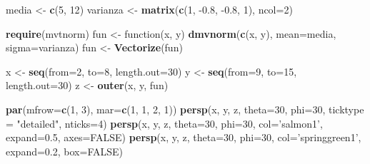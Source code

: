 \documentclass[10pt,]{krantz}
\makeatletter
\newenvironment{Shaded}{\begin{snugshade}}{\end{snugshade}}
\newcommand{\KeywordTok}[1]{\textcolor[rgb]{0.13,0.29,0.53}{\textbf{{#1}}}}
\newcommand{\DataTypeTok}[1]{\textcolor[rgb]{0.13,0.29,0.53}{{#1}}}
\newcommand{\DecValTok}[1]{\textcolor[rgb]{0.00,0.00,0.81}{{#1}}}
\newcommand{\FloatTok}[1]{\textcolor[rgb]{0.00,0.00,0.81}{{#1}}}
\newcommand{\StringTok}[1]{\textcolor[rgb]{0.31,0.60,0.02}{{#1}}}
\newcommand{\OtherTok}[1]{\textcolor[rgb]{0.56,0.35,0.01}{{#1}}}
\newcommand{\NormalTok}[1]{{#1}}
\newenvironment{kframe}{%
\medskip{}
\setlength{\fboxsep}{.8em}
 \def\at@end@of@kframe{}%
 \ifinner\ifhmode%
  \def\at@end@of@kframe{\end{minipage}}%
  \begin{minipage}{\columnwidth}%
 \fi\fi%
 \def\FrameCommand##1{\hskip\@totalleftmargin \hskip-\fboxsep
 \colorbox{shadecolor}{##1}\hskip-\fboxsep
     \hskip-\linewidth \hskip-\@totalleftmargin \hskip\columnwidth}%
 \MakeFramed {\advance\hsize-\width
   \@totalleftmargin\z@ \linewidth\hsize
   \@setminipage}}%
 {\par\unskip\endMakeFramed%
 \at@end@of@kframe}
\renewenvironment{Shaded}{\begin{kframe}}{\end{kframe}}
\makeatother
\begin{document}
\begin{Shaded}
\begin{Highlighting}[]
\NormalTok{media <-}\StringTok{ }\KeywordTok{c}\NormalTok{(}\DecValTok{5}\NormalTok{, }\DecValTok{12}\NormalTok{)}
\NormalTok{varianza <-}\StringTok{ }\KeywordTok{matrix}\NormalTok{(}\KeywordTok{c}\NormalTok{(}\DecValTok{1}\NormalTok{, -}\FloatTok{0.8}\NormalTok{, -}\FloatTok{0.8}\NormalTok{, }\DecValTok{1}\NormalTok{), }\DataTypeTok{ncol=}\DecValTok{2}\NormalTok{)}

\KeywordTok{require}\NormalTok{(mvtnorm)}
\NormalTok{fun <-}\StringTok{ }\NormalTok{function(x, y) }\KeywordTok{dmvnorm}\NormalTok{(}\KeywordTok{c}\NormalTok{(x, y), }\DataTypeTok{mean=}\NormalTok{media, }\DataTypeTok{sigma=}\NormalTok{varianza)}
\NormalTok{fun <-}\StringTok{ }\KeywordTok{Vectorize}\NormalTok{(fun)}

\NormalTok{x <-}\StringTok{ }\KeywordTok{seq}\NormalTok{(}\DataTypeTok{from=}\DecValTok{2}\NormalTok{, }\DataTypeTok{to=}\DecValTok{8}\NormalTok{, }\DataTypeTok{length.out=}\DecValTok{30}\NormalTok{)}
\NormalTok{y <-}\StringTok{ }\KeywordTok{seq}\NormalTok{(}\DataTypeTok{from=}\DecValTok{9}\NormalTok{, }\DataTypeTok{to=}\DecValTok{15}\NormalTok{, }\DataTypeTok{length.out=}\DecValTok{30}\NormalTok{)}
\NormalTok{z <-}\StringTok{ }\KeywordTok{outer}\NormalTok{(x, y, fun)}

\KeywordTok{par}\NormalTok{(}\DataTypeTok{mfrow=}\KeywordTok{c}\NormalTok{(}\DecValTok{1}\NormalTok{, }\DecValTok{3}\NormalTok{), }\DataTypeTok{mar=}\KeywordTok{c}\NormalTok{(}\DecValTok{1}\NormalTok{, }\DecValTok{1}\NormalTok{, }\DecValTok{2}\NormalTok{, }\DecValTok{1}\NormalTok{))}
\KeywordTok{persp}\NormalTok{(x, y, z, }\DataTypeTok{theta=}\DecValTok{30}\NormalTok{, }\DataTypeTok{phi=}\DecValTok{30}\NormalTok{, }\DataTypeTok{ticktype =} \StringTok{"detailed"}\NormalTok{, }\DataTypeTok{nticks=}\DecValTok{4}\NormalTok{)}
\KeywordTok{persp}\NormalTok{(x, y, z, }\DataTypeTok{theta=}\DecValTok{30}\NormalTok{, }\DataTypeTok{phi=}\DecValTok{30}\NormalTok{, }\DataTypeTok{col=}\StringTok{'salmon1'}\NormalTok{, }\DataTypeTok{expand=}\FloatTok{0.5}\NormalTok{, }\DataTypeTok{axes=}\OtherTok{FALSE}\NormalTok{)}
\KeywordTok{persp}\NormalTok{(x, y, z, }\DataTypeTok{theta=}\DecValTok{30}\NormalTok{, }\DataTypeTok{phi=}\DecValTok{30}\NormalTok{, }\DataTypeTok{col=}\StringTok{'springgreen1'}\NormalTok{, }\DataTypeTok{expand=}\FloatTok{0.2}\NormalTok{, }\DataTypeTok{box=}\OtherTok{FALSE}\NormalTok{)}
\end{Highlighting}
\end{Shaded}
\end{document}
